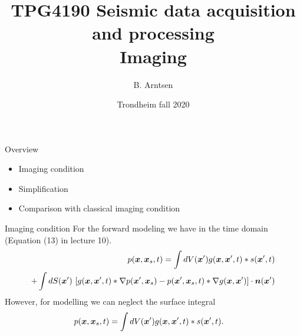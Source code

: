 \documentclass[xcolor=dvipsnames,notes]{beamer}
\begin{document}
\title{TPG4190 Seismic data acquisition and processing \\
               Imaging}
\author{B. Arntsen}
\date{Trondheim fall 2020}
\begin{frame}
 \titlepage
\end{frame}
%
\begin{frame}{Overview}
\begin{itemize}
  \item Imaging condition
  \item Simplification
  \item Comparison with classical imaging condition
  \end{itemize}
\end{frame}
\begin{frame}{Imaging condition}
For the forward modeling we have in the time domain
(Equation (13) in lecture 10).
\begin{eqnarray}
   p(\mbox{\boldmath $x$},\mbox{\boldmath $x$}_s,t) = \int dV(\mbox{\boldmath $x$}') g(\mbox{\boldmath $x$},\mbox{\boldmath $x$}',t)*s(\mbox{\boldmath $x$}',t) \nonumber\\
               +\int dS(\mbox{\boldmath $x$}')\, \left[g(\mbox{\boldmath $x$},\mbox{\boldmath $x$}',t)*\nabla p(\mbox{\boldmath $x$}',\mbox{\boldmath $x$}_s)-
              p(\mbox{\boldmath $x$}',\mbox{\boldmath $x$}_s,t)*\nabla g(\mbox{\boldmath $x$},\mbox{\boldmath $x$}')\right]\cdot \mbox{\boldmath $n$}(\mbox{\boldmath $x$}') \nonumber
\end{eqnarray}
However, for modelling we can neglect the surface integral
\begin{eqnarray}
   p(\mbox{\boldmath $x$},\mbox{\boldmath $x$}_s,t) = \int dV(\mbox{\boldmath $x$}') g(\mbox{\boldmath $x$},\mbox{\boldmath $x$}',t)*s(\mbox{\boldmath $x$}',t).
&&                   \label{eq:10000}
\end{eqnarray}
\end{frame}
\end{document}
